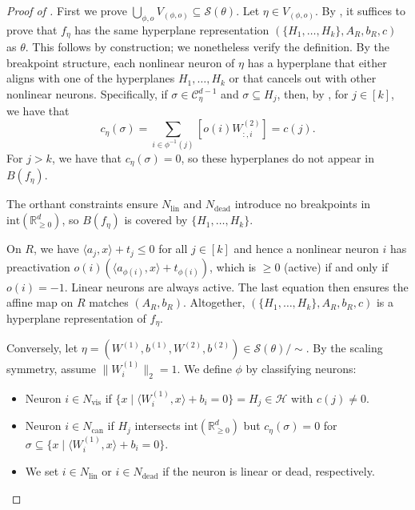 \documentclass{article}
\theoremstyle{definition}
\newcommand{\R}{\mathbb{R}}
\newcommand{\weights}[1]{W^{(#1)}}
\newcommand{\bias}[1]{b^{(#1)}}
\newcommand{\complex}{\mathcal{C}}
\newcommand{\breakpoints}[1]{B({#1})}
\newcommand{\fiber}[1]{\mathcal{S}({#1})}
\newcommand{\inner}[1]{\langle #1 \rangle}
\newcommand{\modulo}[1]{\big/#1}
\begin{document}
\begin{proof}[Proof of ] 
First we prove $\bigcup_{\phi, o} V_{(\phi, o)} \subseteq \fiber{\theta}$. 
Let $\eta \in V_{(\phi, o)}$. 
By , it suffices to prove that $f_\eta$ has the same hyperplane representation
$(\{H_1,\ldots,H_k\}, A_R, b_R, c)$ as $\theta$. 
This follows by construction; we nonetheless verify the definition.
%
By the breakpoint structure, each nonlinear neuron of $\eta$ has a hyperplane that either aligns with one of the hyperplanes $H_1,\ldots,H_k$ or that cancels out with other nonlinear neurons. 
%
Specifically, if $\sigma \in \complex_\eta^{d-1}$ and $\sigma \subseteq H_j$, then, by , for $j \in [k]$, we have that $$c_\eta(\sigma) =  \sum_{i \in \phi^{-1}(j)} [o(i) \weights{2}_{:,i}] = c(j). $$ For $j > k$, we have that $c_\eta(\sigma)=0$, so 
these hyperplanes do not appear in $\breakpoints{f_\eta}$. 


The orthant constraints ensure $N_{\text{lin}}$ and $N_{\text{dead}}$ introduce no breakpoints in $\text{int}(\R_{\ge 0}^d)$, so $B({f_\eta})$ is covered by $\{H_1,\ldots,H_k\}$. 

On $R$, we have $\inner{a_j, x} + t_j \le 0$ for all $j\in[k]$ and hence a nonlinear neuron $i$ has preactivation $o(i)(\inner{a_{\phi(i)}, x} + t_{\phi(i)})$, which is $\ge 0$ (active) if and only if $o(i) = -1$. Linear neurons are always active. The last equation then ensures the affine map on $R$ matches $(A_R, b_R)$. Altogether, $(\{H_1,\ldots,H_k\}, A_R, b_R, c)$ is a hyperplane representation of $f_\eta$. 

Conversely, let $\eta =(\weights{1},\bias{1},\weights{2},\bias{2}) \in \fiber{\theta} \modulo{\sim}$. By the scaling symmetry, assume $\|\weights{1}_i\|_2 = 1$. 
We define $\phi$ by classifying neurons:
\begin{itemize}
    \item Neuron $i \in N_{\text{vis}}$ if $\{x \mid \inner{\weights{1}_i,x} +b_i=0\} =H_j \in \mathcal{H}$ with $c(j) \neq 0$.
    \item Neuron $i \in N_{\text{can}}$ if $H_j $ intersects $\text{int}(\R_{\ge 0}^d)$ but $c_\eta(\sigma) =0$ for $\sigma \subseteq \{x \mid \inner{\weights{1}_i,x} +b_i=0\}$. 
    \item We set $i \in N_{\text{lin}}$ or $i \in N_{\text{dead}}$ if the neuron is linear or dead, respectively. 
\end{itemize} 



\end{proof}
\end{document}
